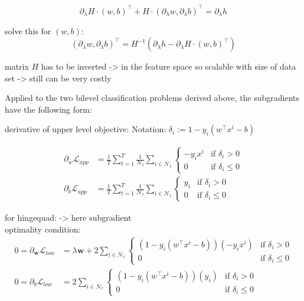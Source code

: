 \[ \partial_{\lambda} H\cdot (w,b)^{\top} + H \cdot(\partial_{\lambda} w, \partial_{\lambda} b)^{\top} = \partial_{\lambda} h  \]

solve this for \((w,b)\):
\[ (\partial_{\lambda} w, \partial_{\lambda}b)^{\top} = H^{-1}\left(\partial_{\lambda}h-\partial_{\lambda} H \cdot(w,b)^{\top}\right) \]

matrix \(H\) has to be inverted -> in the feature space so scalable with size of data set -> still can be very costly \cite{Moore2011}

Applied to the two bilevel classification problems derived above, the subgradients have the following form:

derivative of upper level objective:
Notation: \(\delta_i := 1-y_i(w^{\top}x^i-b)\)

\begin{align}
	\partial_{w}\mathcal{L}_{upp}&= \frac{1}{T}\sum_{t=1}^T\frac{1}{\mathcal{N}_t}\sum_{i \in \mathcal{N}_t}{\left\{\begin{array}{cl} -y_ix^i & \text{if } \delta_i >0 \\ 0 & \text{if } \delta_i \leq 0 \end{array} \right.} \\
	\partial_{b}\mathcal{L}_{upp}&= \frac{1}{T}\sum_{t=1}^T\frac{1}{\mathcal{N}_t}\sum_{i \in \mathcal{N}_t}{\left\{\begin{array}{cl} y_i & \text{if } \delta_i >0 \\ 0 & \text{if } \delta_i \leq 0 \end{array} \right.}
	\end{align}

for hingequad: -> here subgradient \\
optimality condition:
\begin{align}
	0 = \partial_{\bm{w}}\mathcal{L}_{low} &= \lambda \bm{w}+2\sum_{i \in \bar{\mathcal{N}_t}}{\left\{\begin{array}{cl} (1-y_i(w^{\top}x^i-b))(-y_ix^i) & \text{if } \delta_i >0 \\ 0 & \text{if } \delta_i \leq 0 \end{array} \right.} \\
	0 = \partial_b\mathcal{L}_{low} &= 2\sum_{i \in \bar{\mathcal{N}_t}}{\left\{\begin{array}{cl} (1-y_i(w^{\top}x^i-b))(y_i) & \text{if } \delta_i >0 \\ 0 & \text{if } \delta_i \leq 0 \end{array} \right.}
	\end{align}
	

